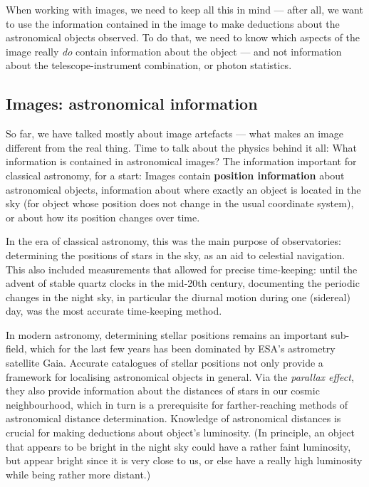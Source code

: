 \documentclass[twocolumn,apj]{openjournal}
\begin{document}
When working with images, we need to keep all this in mind --- after all, we want to use the information contained in the image to make deductions about the astronomical objects observed. To do that, we need to know which aspects of the image really {\em do} contain information about the object --- and not information about the telescope-instrument combination, or photon statistics.

\subsection{Images: astronomical information}

So far, we have talked mostly about image artefacts --- what makes an image different from the real thing. Time to talk about the physics behind it all: What information is contained in astronomical images? The information important for classical astronomy, for a start: Images contain {\bf position information} about astronomical objects, information about where exactly an object is located in the sky (for object whose position does not change in the usual coordinate system), or about how its position changes over time. 

In the era of classical astronomy, this was the main purpose of observatories: determining the positions of stars in the sky, as an aid to celestial navigation. This also included measurements that allowed for precise time-keeping: until the advent of stable quartz clocks in the mid-20th century, documenting the periodic changes in the night sky, in particular the diurnal motion during one (sidereal) day, was the most accurate time-keeping method.

In modern astronomy, determining stellar positions remains an important sub-field, which for the last few years has been dominated by ESA's astrometry satellite Gaia. Accurate catalogues of stellar positions not only provide a framework for localising astronomical objects in general. Via the {\em parallax effect}, they also provide information about the distances of stars in our cosmic neighbourhood, which in turn is a prerequisite for farther-reaching methods of astronomical distance determination. Knowledge of astronomical distances is crucial for making deductions about object's luminosity. (In principle, an object that appears to be bright in the night sky could have a rather faint luminosity, but appear bright since it is very close to us, or else have a really high luminosity while being rather more distant.)
\end{document}
